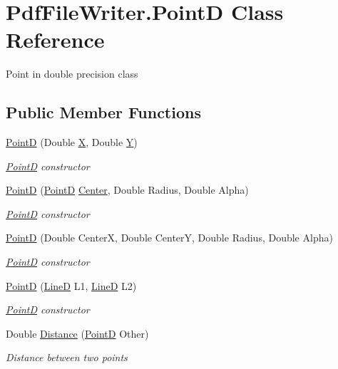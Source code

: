 \hypertarget{class_pdf_file_writer_1_1_point_d}{}\section{Pdf\+File\+Writer.\+PointD Class Reference}
\label{class_pdf_file_writer_1_1_point_d}


Point in double precision class  


\subsection*{Public Member Functions}
\begin{DoxyCompactItemize}
\item 
\hyperlink{class_pdf_file_writer_1_1_point_d_ac0f417c54b74f243867fb193f1c3a091}{PointD} (Double \hyperlink{class_pdf_file_writer_1_1_point_d_ab1ebb5c018dad567af9b941cf2bf9202}{X}, Double \hyperlink{class_pdf_file_writer_1_1_point_d_acb5deebdc097dfdbdf2f7e7d8a143ca1}{Y})
\begin{DoxyCompactList}\small\item\em \hyperlink{class_pdf_file_writer_1_1_point_d}{PointD} constructor \end{DoxyCompactList}\item 
\hyperlink{class_pdf_file_writer_1_1_point_d_ad80b46e53be6abf4e84002ce71994ca5}{PointD} (\hyperlink{class_pdf_file_writer_1_1_point_d}{PointD} \hyperlink{namespace_pdf_file_writer_a3991bfacc8c7be240452dd24ec817157a4f1f6016fc9f3f2353c0cc7c67b292bd}{Center}, Double Radius, Double Alpha)
\begin{DoxyCompactList}\small\item\em \hyperlink{class_pdf_file_writer_1_1_point_d}{PointD} constructor \end{DoxyCompactList}\item 
\hyperlink{class_pdf_file_writer_1_1_point_d_a9c1f11adeee0c1441139d5164596a48c}{PointD} (Double CenterX, Double CenterY, Double Radius, Double Alpha)
\begin{DoxyCompactList}\small\item\em \hyperlink{class_pdf_file_writer_1_1_point_d}{PointD} constructor \end{DoxyCompactList}\item 
\hyperlink{class_pdf_file_writer_1_1_point_d_a1a0cd7839a489c3f3eaeafa69df879e7}{PointD} (\hyperlink{class_pdf_file_writer_1_1_line_d}{LineD} L1, \hyperlink{class_pdf_file_writer_1_1_line_d}{LineD} L2)
\begin{DoxyCompactList}\small\item\em \hyperlink{class_pdf_file_writer_1_1_point_d}{PointD} constructor \end{DoxyCompactList}\item 
Double \hyperlink{class_pdf_file_writer_1_1_point_d_a40faaac15e3ccbe220ddff83abc255e7}{Distance} (\hyperlink{class_pdf_file_writer_1_1_point_d}{PointD} Other)
\begin{DoxyCompactList}\small\item\em Distance between two points \end{DoxyCompactList}\end{DoxyCompactItemize}

